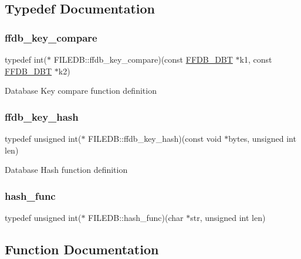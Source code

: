 \subsection{Typedef Documentation}
\mbox{\label{namespaceFILEDB_a1d3bd589ccfab62ecdd78b46aba576e2}} 
\subsubsection{\texorpdfstring{ffdb\_key\_compare}{ffdb\_key\_compare}}
{\footnotesize\ttfamily typedef int($\ast$ F\+I\+L\+E\+D\+B\+::ffdb\+\_\+key\+\_\+compare)(const \mbox{\hyperlink{other__libs_2filedb_2filehash_2ffdb__db_8h_aa2e0984399491df0fdd20898ca8758f9}{F\+F\+D\+B\+\_\+\+D\+BT}} $\ast$k1, const \mbox{\hyperlink{other__libs_2filedb_2filehash_2ffdb__db_8h_aa2e0984399491df0fdd20898ca8758f9}{F\+F\+D\+B\+\_\+\+D\+BT}} $\ast$k2)}

Database Key compare function definition \mbox{\label{namespaceFILEDB_a62446cf48b614494d5708110ddc414bf}} 
\subsubsection{\texorpdfstring{ffdb\_key\_hash}{ffdb\_key\_hash}}
{\footnotesize\ttfamily typedef unsigned int($\ast$ F\+I\+L\+E\+D\+B\+::ffdb\+\_\+key\+\_\+hash)(const void $\ast$bytes, unsigned int len)}

Database Hash function definition \mbox{\label{namespaceFILEDB_a9e945e165dd500023ad29b4fcb2332b8}} 
\subsubsection{\texorpdfstring{hash\_func}{hash\_func}}
{\footnotesize\ttfamily typedef unsigned int($\ast$ F\+I\+L\+E\+D\+B\+::hash\+\_\+func)(char $\ast$str, unsigned int len)}



\subsection{Function Documentation}
\mbox{\label{namespaceFILEDB_a3d87ecce7111516944b8b8e532aad4ea}} 
